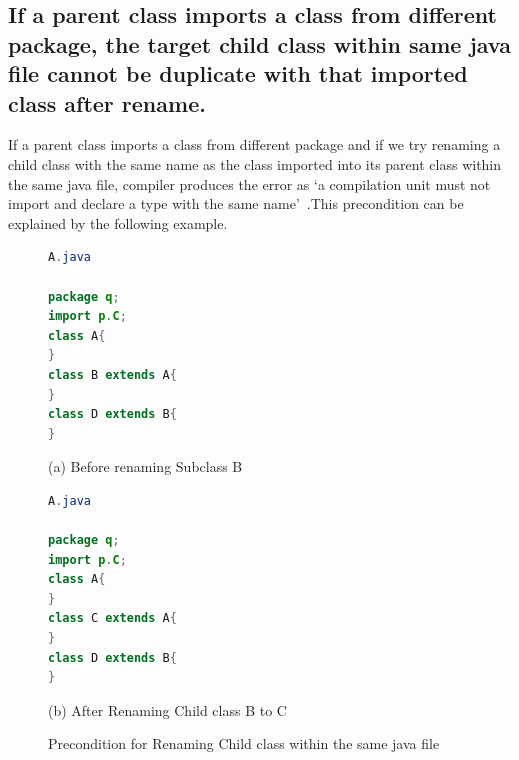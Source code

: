\subsection{If a parent class imports a class from different package, the target child class within same java file cannot be duplicate with that imported class after rename.}

If a parent class imports a class from different package and if we try renaming a child class with the same name as the class imported into its parent class within the same java file, compiler produces the error as `a compilation unit must not import and declare a type with the same name'~\cite{EclipseWebPage}.This precondition can be explained by the following example.

\begin{figure}[th]
\centering
\begin{minipage}[t]{0.45\linewidth}
\begin{lstlisting}[language=java, basicstyle=\scriptsize\ttfamily,frame=single]	
A.java

package q;
import p.C;
class A{	
}
class B extends A{	
}
class D extends B{
}
\end{lstlisting}
\tiny{(a) Before renaming Subclass B}
\end{minipage}
\hfill
\begin{minipage}[t]{0.45\linewidth}
\begin{lstlisting}[language=java, basicstyle=\scriptsize\ttfamily,frame=single]
A.java

package q;
import p.C;
class A{	
}
class C extends A{	
}
class D extends B{
}	
\end{lstlisting}
\tiny{(b) After Renaming Child class  B to C}
\end{minipage}
\caption{Precondition for Renaming Child class within the same java file}
\label{figure:figpc3_1}
\end{figure}


